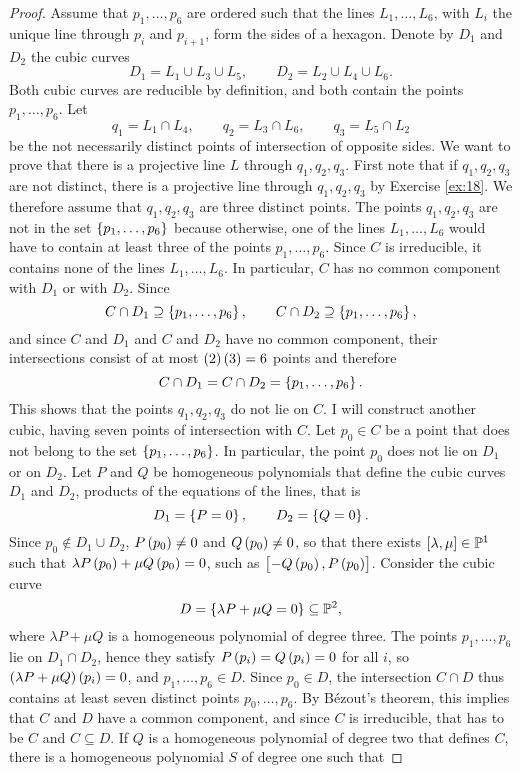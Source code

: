 \begin{proof}
Assume that $ p_1, \dots, p_6 $ are ordered such that the lines $ L_1, \dots, L_6 $, with $ L_i $ the unique line through $ p_i $ and $ p_{i + 1} $, form the sides of a hexagon. Denote by $ D_1 $ and $ D_2 $ the cubic curves
$$ D_1 = L_1 \cup L_3 \cup L_5, \qquad D_2 = L_2 \cup L_4 \cup L_6. $$
Both cubic curves are reducible by definition, and both contain the points $ p_1, \dots, p_6 $. Let
$$ q_1 = L_1 \cap L_4, \qquad q_2 = L_3 \cap L_6, \qquad q_3 = L_5 \cap L_2 $$
be the not necessarily distinct points of intersection of opposite sides. We want to prove that there is a projective line $ L $ through $ q_1, q_2, q_3 $. First note that if $ q_1, q_2, q_3 $ are not distinct, there is a projective line through $ q_1, q_2, q_3 $ by Exercise \ref{ex:18}. We therefore assume that $ q_1, q_2, q_3 $ are three distinct points. The points $ q_1, q_2, q_3 $ are not in the set $ \cbr{p_1, \dots, p_6} $ because otherwise, one of the lines $ L_1, \dots, L_6 $ would have to contain at least three of the points $ p_1, \dots, p_6 $. Since $ C $ is irreducible, it contains none of the lines $ L_1, \dots, L_6 $. In particular, $ C $ has no common component with $ D_1 $ or with $ D_2 $. Since
$$ C \cap D_1 \supseteq \cbr{p_1, \dots, p_6}, \qquad C \cap D_2 \supseteq \cbr{p_1, \dots, p_6}, $$
and since $ C $ and $ D_1 $ and $ C $ and $ D_2 $ have no common component, their intersections consist of at most $ \br{2}\br{3} = 6 $ points and therefore
$$ C \cap D_1 = C \cap D_2 = \cbr{p_1, \dots, p_6}. $$
This shows that the points $ q_1, q_2, q_3 $ do not lie on $ C $. I will construct another cubic, having seven points of intersection with $ C $. Let $ p_0 \in C $ be a point that does not belong to the set $ \cbr{p_1, \dots, p_6} $. In particular, the point $ p_0 $ does not lie on $ D_1 $ or on $ D_2 $. Let $ P $ and $ Q $ be homogeneous polynomials that define the cubic curves $ D_1 $ and $ D_2 $, products of the equations of the lines, that is
$$ D_1 = \cbr{P = 0}, \qquad D_2 = \cbr{Q = 0}. $$
Since $ p_0 \notin D_1 \cup D_2 $, $ P\br{p_0} \ne 0 $ and $ Q\br{p_0} \ne 0 $, so that there exists $ \sbr{\lambda, \mu} \in \P^1 $ such that $ \lambda P\br{p_0} + \mu Q\br{p_0} = 0 $, such as $ \sbr{-Q\br{p_0}, P\br{p_0}} $. Consider the cubic curve
$$ D = \cbr{\lambda P + \mu Q = 0} \subseteq \P^2, $$
where $ \lambda P + \mu Q $ is a homogeneous polynomial of degree three. The points $ p_1, \dots, p_6 $ lie on $ D_1 \cap D_2 $, hence they satisfy $ P\br{p_i} = Q\br{p_i} = 0 $ for all $ i $, so $ \br{\lambda P + \mu Q}\br{p_i} = 0 $, and $ p_1, \dots, p_6 \in D $. Since $ p_0 \in D $, the intersection $ C \cap D $ thus contains at least seven distinct points $ p_0, \dots, p_6 $. By B\'ezout's theorem, this implies that $ C $ and $ D $ have a common component, and since $ C $ is irreducible, that has to be $ C $ and $ C \subseteq D $. If $ Q $ is a homogeneous polynomial of degree two that defines $ C $, there is a homogeneous polynomial $ S $ of degree one such that

\end{proof}
